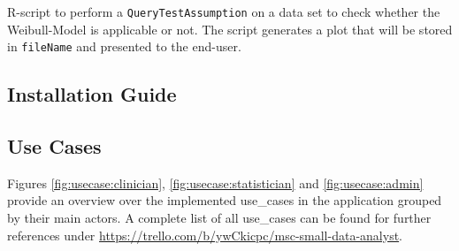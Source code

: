 \begin{listing}[hbtp]
	\caption{R-script to perform a \texttt{QueryTestAssumption} on a data set to check whether the Weibull-Model is applicable or not. The script generates a plot that will be stored in \texttt{fileName} and presented to the end-user.}
	\label{lst:rcode}
\end{listing}


\subsection{Installation Guide}
\label{app:installation}


\subsection{Use Cases}
\label{app:use_cases}

Figures \ref{fig:usecase:clinician}, \ref{fig:usecase:statistician} and \ref{fig:usecase:admin} provide an overview over the implemented \glspl{use_case} in the application grouped by their main actors. A complete list of all \glspl{use_case} can be found for further references under \href{https://trello.com/b/ywCkicpc/msc-small-data-analyst}{https://trello.com/b/ywCkicpc/msc-small-data-analyst}.

